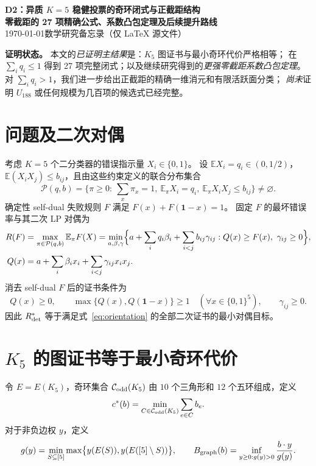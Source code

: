 \documentclass[11pt,a4paper]{ctexart}
\theoremstyle{remark}
\newcommand{\V}{[5]}
\newcommand{\CE}{\mathcal C_{\rm odd}(K_5)}
\newcommand{\Pset}{\mathcal P(q,b)}
\newcommand{\Rstar}{R^*_{\rm det}}
\newcommand{\one}{\mathbf 1}
\begin{document}
\begin{center}
{\Large\bfseries D2：异质 $K=5$ 稳健投票的奇环闭式与正截距结构}\\[.4em]
{\large\bfseries 零截距的 27 项精确公式、系数凸包定理及后续提升路线}\\[.5em]
\today\quad\textbar\quad 数学研究备忘录（仅 \LaTeX{} 源文件）
\end{center}
\noindent\textbf{证明状态。}
本文的\emph{已证明主结果}是：$K_5$ 图证书与最小奇环代价严格相等；
在 $\sum_iq_i\le1$ 得到 27 项完整闭式；以及继续研究得到的\emph{更强零截距系数凸包定理}。
对 $\sum_iq_i>1$，我们进一步给出正截距的精确一维消元和有限活跃面分类；
\emph{尚未}证明 $U_{188}$ 或任何规模为几百项的候选式已经完整。

\section{问题及二次对偶}
考虑 $K=5$ 个二分类器的错误指示量 $X_i\in\{0,1\}$。
设 $\mathbb E X_i=q_i\in(0,1/2)$，
$\mathbb E(X_iX_j)\le b_{ij}$，且由这些约束定义的联合分布集合
\[
\Pset=\bigl\{\pi\ge0:\ \sum_x\pi_x=1,\ \mathbb E_\pi X_i=q_i,\ 
\mathbb E_\pi X_iX_j\le b_{ij}\bigr\}\ne\varnothing.
\]
确定性 self-dual 失败规则 $F$ 满足 $F(x)+F(\one-x)=1$。
固定 $F$ 的最坏错误率与其二次 LP 对偶为
\begin{align}
R(F)&=\max_{\pi\in\Pset}\mathbb E_\pi F(X)
=\min_{a,\beta,\gamma}\Bigl\{a+\sum_i q_i\beta_i+
\sum_{i<j}b_{ij}\gamma_{ij}: Q(x)\ge F(x),\ \gamma_{ij}\ge0\Bigr\},\label{eq:fixeddual}\\
Q(x)&=a+\sum_i\beta_ix_i+\sum_{i<j}\gamma_{ij}x_ix_j.\notag
\end{align}
消去 self-dual $F$ 后的证书条件为
\begin{equation}\label{eq:orientation}
Q(x)\ge0,\qquad
\max\{Q(x),Q(\one-x)\}\ge1\quad(\forall x\in\{0,1\}^5),
\qquad\gamma_{ij}\ge0.
\end{equation}
因此 $\Rstar$ 等于满足式~\eqref{eq:orientation} 的全部二次证书的最小对偶目标。

\section{$K_5$ 的图证书等于最小奇环代价}
令 $E=E(K_5)$，奇环集合 $\CE$ 由 $10$ 个三角形和 $12$ 个五环组成，定义
\[
c^*(b)=\min_{C\in\CE}\sum_{e\in C}b_e.
\]
对于非负边权 $y$，定义
\[
g(y)=\min_{S\subseteq\V}\max\bigl\{y(E(S)),y(E(\V\setminus S))\bigr\},\qquad
B_{\rm graph}(b)=\inf_{y\ge0:g(y)>0}\frac{b\cdot y}{g(y)}.
\]
\end{document}
